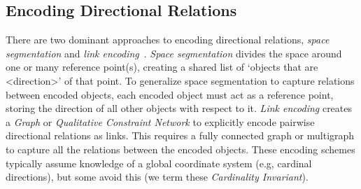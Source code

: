 \subsection{Encoding Directional Relations}
\par{
    There are two dominant approaches to encoding directional relations, \textit{space segmentation} and \textit{link encoding}~\cite{Dellapenna2012,Dellapenna2017}.
%
    \textit{Space segmentation} divides the space around one or many reference point(s), creating a shared list of `objects that are <direction>' of that point. 
    To generalize space segmentation to capture relations between encoded objects, each encoded object must act as a reference point, storing the direction of all other objects with respect to it.
    \textit{Link encoding} creates a \textit{Graph} or \textit{Qualitative Constraint Network} to explicitly encode pairwise directional relations as links.
    This requires a fully connected graph or multigraph to capture all the relations between the encoded objects.
    These encoding schemes typically assume knowledge of a global coordinate system (e.g, cardinal directions), but some avoid this (we term these \textit{Cardinality Invariant}).
}


